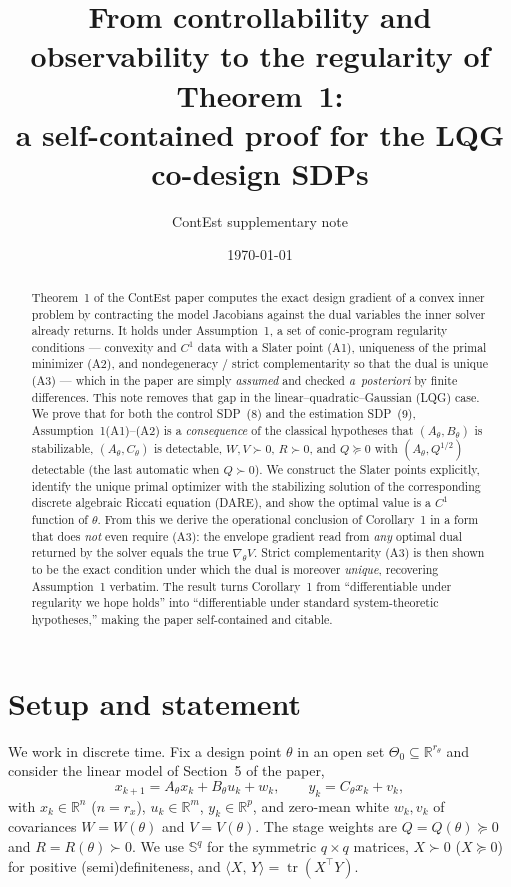 \documentclass[11pt]{article}
\title{\bf From controllability and observability to the regularity of
Theorem~1:\\
a self-contained proof for the LQG co-design SDPs}
\author{ContEst supplementary note}
\date{\today}
\theoremstyle{definition}
\DeclareMathOperator{\tr}{tr}
\newcommand{\R}{\mathbb{R}}
\newcommand{\Sym}{\mathbb{S}}
\newcommand{\Th}{\theta}
\newcommand{\Nbhd}{\Theta_{0}}
\newcommand{\half}{{1/2}}
\newcommand{\inner}[2]{\langle #1,\, #2\rangle}
\begin{document}
\maketitle

\begin{abstract}
Theorem~1 of the ContEst paper computes the exact design gradient of a convex
inner problem by contracting the model Jacobians against the dual variables the
inner solver already returns. It holds under Assumption~1, a set of conic-program
regularity conditions --- convexity and $C^1$ data with a Slater point (A1),
uniqueness of the primal minimizer (A2), and nondegeneracy / strict
complementarity so that the dual is unique (A3) --- which in the paper are simply
\emph{assumed} and checked \emph{a~posteriori} by finite differences. This note
removes that gap in the linear--quadratic--Gaussian (LQG) case. We prove that for
both the control SDP~(8) and the estimation SDP~(9), Assumption~1(A1)--(A2) is a
\emph{consequence} of the classical hypotheses that $(A_\theta,B_\theta)$ is
stabilizable, $(A_\theta,C_\theta)$ is detectable, $W,V\succ0$, $R\succ0$, and
$Q\succeq0$ with $(A_\theta,Q^{\half})$ detectable (the last automatic when
$Q\succ0$). We construct the Slater points explicitly, identify the unique primal
optimizer with the stabilizing solution of the corresponding discrete algebraic
Riccati equation (DARE), and show the optimal value is a $C^1$ function of
$\theta$. From this we derive the operational conclusion of Corollary~1 in a form
that does \emph{not} even require (A3): the envelope gradient read from
\emph{any} optimal dual returned by the solver equals the true $\nabla_\theta V$.
Strict complementarity (A3) is then shown to be the exact condition under which
the dual is moreover \emph{unique}, recovering Assumption~1 verbatim. The result
turns Corollary~1 from ``differentiable under regularity we hope holds'' into
``differentiable under standard system-theoretic hypotheses,'' making the paper
self-contained and citable.
\end{abstract}

\tableofcontents

\section{Setup and statement}\label{sec:setup}

We work in discrete time. Fix a design point $\Th$ in an open set
$\Nbhd\subseteq\R^{r_\theta}$ and consider the linear model of Section~5 of the
paper,
\begin{equation}\label{eq:model}
x_{k+1}=A_\Th x_k+B_\Th u_k+w_k,\qquad y_k=C_\Th x_k+v_k,
\end{equation}
with $x_k\in\R^{n}$ ($n=r_x$), $u_k\in\R^{m}$, $y_k\in\R^{p}$, and zero-mean
white $w_k,v_k$ of covariances $W=W(\Th)$ and $V=V(\Th)$. The stage weights are
$Q=Q(\Th)\succeq0$ and $R=R(\Th)\succ0$. We use $\Sym^{q}$ for the symmetric
$q\times q$ matrices, $X\succ0$ ($X\succeq0$) for positive (semi)definiteness,
and $\inner{X}{Y}=\tr(X^\top Y)$.
\end{document}
